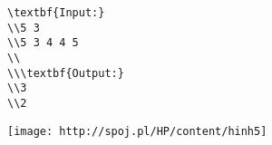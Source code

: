 \begin{verbatim}
\textbf{Input:}
\\5 3
\\5 3 4 4 5
\\
\\\textbf{Output:}
\\3
\\2\end{verbatim}


\texttt{[image: http://spoj.pl/HP/content/hinh5]}
